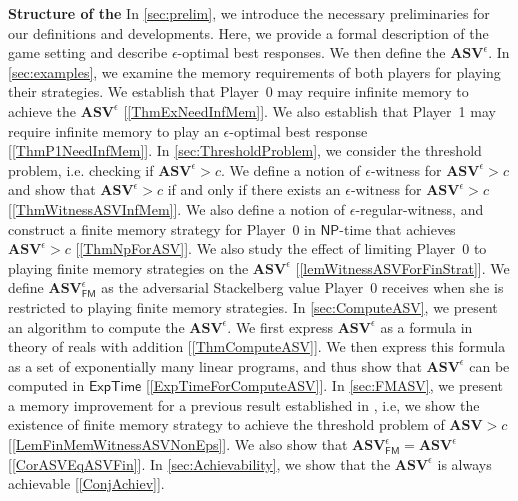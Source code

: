 \textbf{Structure of the \mydoc} In \cref{sec:prelim}, we introduce the necessary preliminaries for our definitions and developments. Here, we provide a formal description of the game setting and describe $\epsilon$-optimal best responses. We then define the $\mathbf{ASV}^{\epsilon}$.
In \cref{sec:examples}, we examine the memory requirements of both players for playing their strategies. We establish that Player~0 may require infinite memory to achieve the $\mathbf{ASV}^{\epsilon}$ [\cref{ThmExNeedInfMem}]. We also establish that Player~1 may require infinite memory to play an $\epsilon$-optimal best response [\cref{ThmP1NeedInfMem}]. 
In \cref{sec:ThresholdProblem}, we consider the threshold problem, i.e. checking if $\mathbf{ASV}^{\epsilon} > c$. We define a notion of $\epsilon$-witness for $\mathbf{ASV}^{\epsilon} > c$ and show that $\mathbf{ASV}^{\epsilon} > c$ if and only if there exists an $\epsilon$-witness for $\mathbf{ASV}^{\epsilon} > c$ [\cref{ThmWitnessASVInfMem}]. We also define a notion of $\epsilon$-regular-witness, and construct a finite memory strategy for Player~0 in $\mathsf{NP}$-time that achieves $\mathbf{ASV}^{\epsilon} > c$ [\cref{ThmNpForASV}]. We also study the effect of limiting Player~0 to playing finite memory strategies on the $\mathbf{ASV}^{\epsilon}$ [\cref{lemWitnessASVForFinStrat}]. We define $\mathbf{ASV}^{\epsilon}_{\mathsf{FM}}$ as the adversarial Stackelberg value Player~0 receives when she is restricted to playing finite memory strategies.
In \cref{sec:ComputeASV}, we present an algorithm to compute the $\mathbf{ASV}^{\epsilon}$. We first express $\mathbf{ASV}^{\epsilon}$ as a formula in theory of reals with addition [\cref{ThmComputeASV}]. We then express this formula as a set of exponentially many linear programs, and thus show that $\mathbf{ASV}^{\epsilon}$ can be computed in $\mathsf{ExpTime}$ [\cref{ExpTimeForComputeASV}].
In \cref{sec:FMASV}, we present a memory improvement for a previous result established in \cite{FGR20}, i.e, we show the existence of finite memory strategy to achieve the threshold problem of $\mathbf{ASV} > c$ [\cref{LemFinMemWitnessASVNonEps}]. We also show that $\mathbf{ASV}^{\epsilon}_{\mathsf{FM}} = \mathbf{ASV}^{\epsilon}$ [\cref{CorASVEqASVFin}].
In \cref{sec:Achievability}, we show that the $\mathbf{ASV}^{\epsilon}$ is always achievable [\cref{ConjAchiev}].